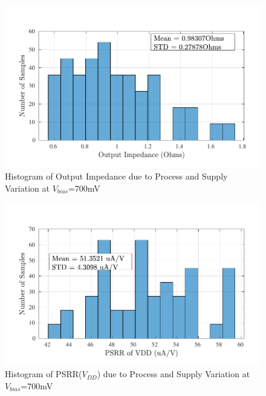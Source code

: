 \begin{figure} [H]
\centering
\includegraphics[scale=1]{Figures/Corners/Overall/PV_Max/PDFs/PV_Max_zout.pdf}
\caption{Histogram of Output Impedance due to Process and Supply Variation at $V_{bias}$=700mV}
\end{figure}

\begin{figure} [H]
\centering
\includegraphics[scale=1]{Figures/Corners/Overall/PV_Max/PDFs/PV_Max_psrrp.pdf}
\caption{Histogram of PSRR($V_{DD}$) due to Process and Supply Variation at $V_{bias}$=700mV}
\end{figure}

